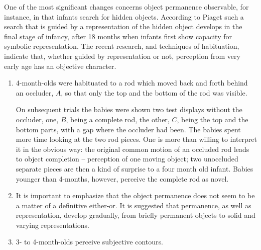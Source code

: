 \pa\label{sub:psychexb} One of the most significant changes concerns object
permanence observable, for instance, in that infants search for hidden objects.
According to Piaget such a search that is
guided by a representation of the hidden object develops in the final stage of
infancy, after 18 months when infants first show capacity for symbolic
representation. The recent research, and techniques of habituation, indicate
that, whether guided by representation or not, perception from very early age
has an objective character. 
\begin{enumerate}\MyLPar
\item 4-month-olds were habituated to a rod which moved back and forth behind an
  occluder, $A$, so that only the top and the bottom of the rod was visible.
\begin{center}
\epsfxsize=8cm
\end{center}
On subsequent trials the babies were shown two test displays without the
occluder, one, $B$, being a complete rod, the other, $C$, being the top and the
bottom parts, with a gap where the occluder had been. The babies spent more time
looking at the two rod pieces. One is more than willing to
interpret it in the obvious way: the original common motion of an occluded rod
leads to object completion -- perception of one moving object; two unoccluded
separate pieces are then a kind of surprise to a four month old infant.  Babies
younger than 4-months, however, perceive the complete rod as novel.
\item It is important to emphasize that the object permanence does not seem to
  be a matter of a definitive either-or. It is suggested
  that permanence, as well as representation, develop gradually, from briefly
  permanent objects to solid and varying representations.
\item 3- to 4-month-olds perceive subjective contours.
%
\begin{center}

\end{center}
\end{enumerate}
